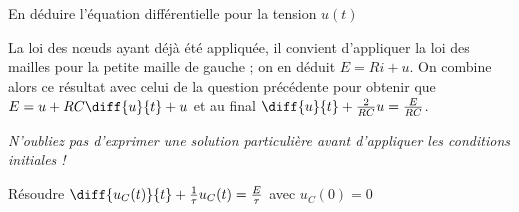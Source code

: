 \begin{enonce}
En déduire l'équation différentielle pour la tension $u(t)$
\end{enonce}


\begin{corrige}
La loi des nœuds ayant déjà été appliquée, il convient d'appliquer la loi des mailles pour la petite maille de gauche ; on en déduit $E = Ri + u$. On combine alors ce résultat avec celui de la question précédente pour obtenir que $E = u + RC \diff{u}{t} + u$ et au final $\diff{u}{t} + \frac{2}{RC} u = \frac{E}{RC}$.
\end{corrige}



\finEntrainement




\hauteurLargeurCadreReponse		{8mm}{6cm}
\initialisationEntrainement


{\itshape N'oubliez pas d'exprimer une solution particulière avant d'appliquer les conditions initiales !}

\smallskip

\debutEntrainement


\begin{enonce}
Résoudre $\diff{u_C(t)}{t} + \frac{1}{\tau} u_C(t) = \frac{E}{\tau}$ \quad avec $u_C(0)=0$
\end{enonce}

